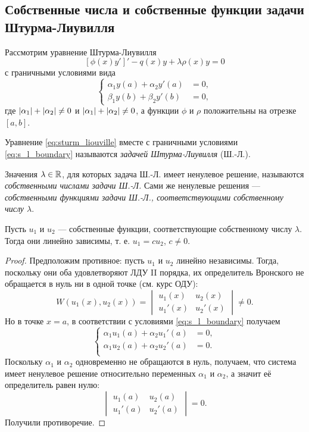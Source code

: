 \subsection{Собственные числа и собственные функции задачи Штурма-Лиувилля}
Рассмотрим уравнение Штурма-Лиувилля
\begin{equation}\label{eq:sturm_liouville}
    [\phi(x)y']' - q(x) y + \lambda \rho(x) y = 0
\end{equation}
с граничными условиями вида
\begin{equation}\label{eq:s_l_boundary}
\left\{
\begin{aligned}
    \alpha_1 y(a) + \alpha_2 y'(a) &= 0, \\
    \beta_1 y(b) + \beta_2 y'(b) &= 0,
\end{aligned}
\right.
\end{equation}
где $\left|\alpha_1\right| + \left|\alpha_2\right| \neq 0$ и $\left|\alpha_1\right| + \left|\alpha_2\right| \neq 0$, а функции $\phi$ и $\rho$ положительны на отрезке $[a, b]$.

Уравнение \eqref{eq:sturm_liouville} вместе с граничными условиями \eqref{eq:s_l_boundary} называются \emph{задачей Штурма-Лиувилля} (Ш.-Л.).

Значения $\lambda \in \mathbb{R}$, для которых задача Ш.-Л. имеет ненулевое решение, называются \emph{собственными числами задачи Ш.-Л.} Сами же ненулевые решения --- \emph{собственными функциями задачи Ш.-Л., соответствующими собственному числу $\lambda$}.

\begin{theorem}
    Пусть $u_1$ и $u_2$ --- собственные функции, соответствующие собственному числу $\lambda$. Тогда они линейно зависимы, т. е. $u_1 = c u_2$, $c \neq 0$.
\end{theorem}

\begin{proof}
    Предположим противное: пусть $u_1$ и $u_2$ линейно независимы. Тогда, поскольку они оба удовлетворяют ЛДУ II порядка, их определитель Вронского не обращается в нуль ни в одной точке (см. курс ОДУ):
    \[
        W(u_1(x), u_2(x)) = \begin{vmatrix}
            u_1(x) & u_2(x) \\
            u_1'(x) & u_2'(x)
        \end{vmatrix} \neq 0.
    \]
    Но в точке $x = a$, в соответствии с условиями \eqref{eq:s_l_boundary} получаем
    \[ \left\{
        \begin{aligned}
            \alpha_1 u_1(a) + \alpha_2 u_1'(a) &= 0, \\
            \alpha_1 u_2(a) + \alpha_2 u_2'(a) &= 0. \\
        \end{aligned}
        \right.
    \]
    Поскольку $\alpha_1$ и $\alpha_2$ одновременно не обращаются в нуль, получаем, что система имеет ненулевое решение относительно переменных $\alpha_1$ и $\alpha_2$, а значит её определитель равен нулю:
    \[
        \begin{vmatrix}
            u_1(a) & u_2(a) \\
            u_1'(a) & u_2'(a)
        \end{vmatrix} = 0.
    \]
    Получили противоречие.
\end{proof}

